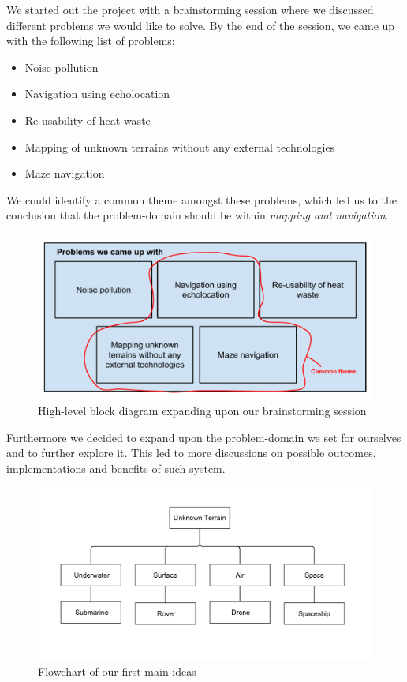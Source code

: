 We started out the project with a brainstorming session where we discussed different problems we would like to solve. By the end of the session, we came up with the following list of problems:
\begin{itemize}
	\item Noise pollution
	\item Navigation using echolocation
	\item Re-usability of heat waste
	\item Mapping of unknown terrains without any external technologies
	\item Maze navigation
\end{itemize}

We could identify a common theme amongst these problems, which led us to the conclusion that the problem-domain should be within \textit{mapping and navigation}. 

\begin{figure}[!h]
	\centering
	\includegraphics[scale=.7]{images/high-level-block.pdf}
	\caption{High-level block diagram expanding upon our brainstorming session}
	\label{fig:highlevelblock}
\end{figure}

Furthermore we decided to expand upon the problem-domain we set for ourselves and to further explore it. This led to more discussions on possible outcomes, implementations and benefits of such system.

\begin{figure}[!h]
	\centering
	\includegraphics[scale=.1]{images/level1.png}
	\caption{Flowchart of our first main ideas}
	\label{fig:level1}
\end{figure}

